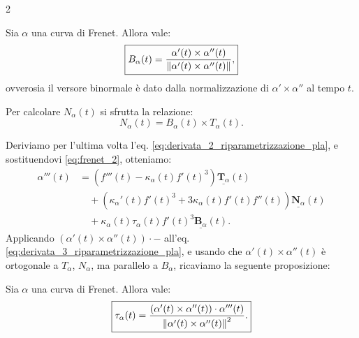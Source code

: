 \begin{multicols*}{2}
    \begin{proposition}
        Sia $\alpha$ una curva di Frenet. Allora vale:
        \[
            \boxed{B_\alpha(t) = \frac{\alpha'(t) \times \alpha''(t)}{\left\lVert \alpha'(t) \times \alpha''(t) \right\rVert},}
        \]
        ovverosia il versore binormale è dato dalla normalizzazione
        di $\alpha' \times \alpha''$ al tempo $t$.
    \end{proposition}

    \begin{remark}
        Per calcolare $N_\alpha(t)$ si sfrutta la relazione:
        \[ \boxed{N_\alpha(t) = B_\alpha(t) \times T_\alpha(t).} \]
    \end{remark}

    \begin{remark}
        Deriviamo per l'ultima volta l'eq. \eqref{eq:derivata_2_riparametrizzazione_pla}, e sostituendovi
        \eqref{eq:frenet_2}, otteniamo:
        \begin{equation} \label{eq:derivata_3_riparametrizzazione_pla}
            \begin{aligned}
                \alpha'''(t) & = \left(f'''(t) - \kappa_\alpha(t) f'(t)^3\right) \underline{\mathbf{T}_\alpha}(t)                                  \\
                             & \quad + \left({\kappa_\alpha}'(t) f'(t)^3 + 3 \kappa_\alpha(t) f'(t) f''(t)\right) \underline{\mathbf{N}_\alpha}(t) \\
                             & \quad + \kappa_\alpha(t) \tau_\alpha(t) f'(t)^3 \underline{\mathbf{B}_\alpha}(t).
            \end{aligned}
        \end{equation}
        Applicando $(\alpha'(t) \times \alpha''(t)) \cdot -$ all'eq. \eqref{eq:derivata_3_riparametrizzazione_pla},
        e usando che $\alpha'(t) \times \alpha''(t)$ è
        ortogonale a $T_\alpha$, $N_\alpha$, ma parallelo a $B_\alpha$, ricaviamo la seguente proposizione:
    \end{remark}

    \begin{proposition}
        Sia $\alpha$ una curva di Frenet. Allora vale:
        \[
            \boxed{\tau_\alpha(t) = \frac{(\alpha'(t) \times \alpha''(t)) \cdot \alpha'''(t)}{\left\lVert \alpha'(t) \times \alpha''(t) \right\rVert^2}.}
        \]
    \end{proposition}


\end{multicols*}
